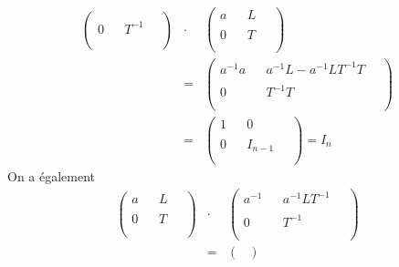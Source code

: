 \begin{enumerate}[(1)]
\begin{eqnarray*}
\begin{pmatrix}
          &   &   &  ~  \\
        0 &   & T^{-1} & ~  \\
          &   &   &  ~ \\
      \end{pmatrix} &\cdot&
      \begin{pmatrix}
        a &   & L &  ~ \\
          &   &   &  ~ \\
        0 &   & T &  ~ \\
          &   &   &  ~ \\
      \end{pmatrix} \\
      &=&\begin{pmatrix}
        a^{-1} a &   & a^{-1} L - a^{-1} L T^{-1} T & ~ \\
          &   &   & ~ \\
        0 &   & T^{-1} T & ~ \\
          &   &   & ~ \\
      \end{pmatrix}  \\
      &=&\begin{pmatrix}
        1 &   & 0 & ~ \\
          &   &   & ~ \\
        0 &   & I_{n-1} & ~ \\
          &   &   & ~ \\
      \end{pmatrix}
      = I_n
    \end{eqnarray*}
    On a également
    \begin{eqnarray*}
      \begin{pmatrix}
        a &   & L &  ~ \\
          &   &   &  ~ \\
        0 &   & T &  ~ \\
          &   &   &  ~ \\
      \end{pmatrix} &\cdot&
      \begin{pmatrix}
        a^{-1} &   & a^{-1} L T^{-1} & ~ \\
          &   &   &  ~  \\
        0 &   & T^{-1} & ~  \\
          &   &   &  ~ \\
      \end{pmatrix}\\
      &=&\begin{pmatrix}

\end{pmatrix}
\end{eqnarray*}
\end{enumerate}
